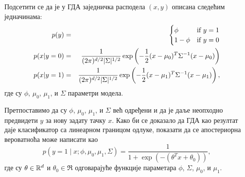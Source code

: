 \item {}
Подсетити се да је у ГДА заједничка расподела $(x, y)$ описана следећим једначинама:
%
\begin{eqnarray*}
	p(y) &=& \begin{cases}
	\phi & \mbox{if~} y = 1 \\
	1 - \phi & \mbox{if~} y = 0 \end{cases} \\
	p(x | y=0) &=& \frac{1}{(2\pi)^{{d}/2} |\Sigma|^{1/2}}
		\exp\left(-\frac{1}{2}(x-\mu_{0})^T \Sigma^{-1} (x-\mu_{0})\right) \\
	p(x | y=1) &=& \frac{1}{(2\pi)^{{d}/2} |\Sigma|^{1/2}}
		\exp\left(-\frac{1}{2}(x-\mu_1)^T \Sigma^{-1} (x-\mu_1) \right),
\end{eqnarray*}
%
где су $\phi$, $\mu_0$, $\mu_1$, и $\Sigma$ параметри модела.

Претпоставимо да су $\phi$, $\mu_0$, $\mu_1$, и $\Sigma$ већ одређени и да је даље неопходно предвидети $y$ за нову задату тачку $x$. Како би се доказало да ГДА као резултат даје класификатор са линеарном границом одлуке, показати да се апостериорна вероватноћа може написати као
%
\begin{equation*}
	p(y = 1\mid x; \phi, \mu_0, \mu_1, \Sigma)
	= \frac{1}{1 + \exp(-(\theta^T x + \theta_0))},
\end{equation*}
%
где су $\theta\in{\mathbb R}^{d}$ и $\theta_{0}\in\Re$ одговарајуће функције параметара $\phi$, $\Sigma$, $\mu_0$, и $\mu_1$.


